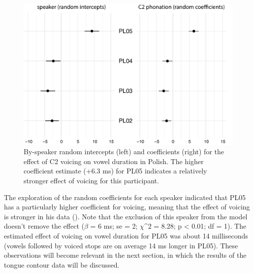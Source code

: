 \documentclass[authoryear, twocolumn]{elsarticle}
\begin{document}
\begin{figure}
    \centering
    \includegraphics[height=.3\textwidth]{fig/polish-re.pdf}
    \caption{By-speaker random intercepts (left) and coefficients (right) for the effect of C2 voicing on vowel duration in Polish. The higher coefficient estimate (+6.3 ms) for PL05 indicates a relatively stronger effect of voicing for this participant.}
    \label{f:polish-re}
\end{figure}

The exploration of the random coefficients for each speaker indicated
that PL05 has a particularly higher coefficient for voicing, meaning
that the effect of voicing is stronger in his data ().
Note that the exclusion of this speaker from the model doesn't remove
the effect (\(\beta\) = 6 ms; se = 2; \(\chi\^2\) = 8.28; p \textless{}
0.01; df = 1). The estimated effect of voicing on vowel duration for
PL05 was about 14 milliseconds (vowels followed by voiced stops are on
average 14 ms longer in PL05). These observations will become relevant
in the next section, in which the results of the tongue contour data
will be discussed.


\end{document}

